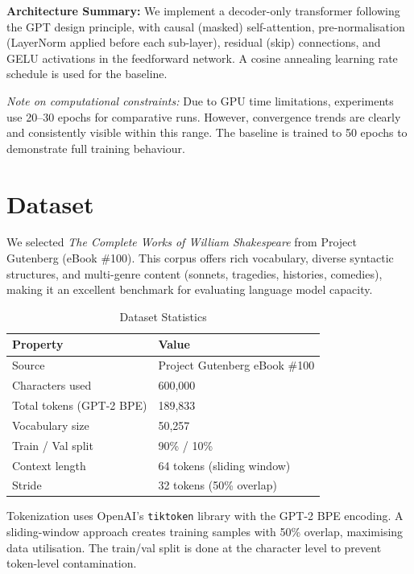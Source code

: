 \documentclass[12pt,a4paper]{article}
\newenvironment{keyinsight}{%
  \begin{tcolorbox}[colback=lightblue!60, colframe=accentblue,
    fonttitle=\bfseries\small\color{navyblue},
    title={Key Insight}, boxrule=0.6pt,
    left=6pt, right=6pt, top=4pt, bottom=4pt]%
}{\end{tcolorbox}}
\begin{document}
\textbf{Architecture Summary:} We implement a decoder-only transformer following the GPT design principle, with causal (masked) self-attention, pre-normalisation (LayerNorm applied before each sub-layer), residual (skip) connections, and GELU activations in the feedforward network. A cosine annealing learning rate schedule is used for the baseline.

\begin{keyinsight}
\textit{Note on computational constraints:} Due to GPU time limitations, experiments use 20–30 epochs for comparative runs. However, convergence trends are clearly and consistently visible within this range. The baseline is trained to 50 epochs to demonstrate full training behaviour.
\end{keyinsight}

\section{Dataset}

We selected \textit{The Complete Works of William Shakespeare} from Project Gutenberg (eBook \#100). This corpus offers rich vocabulary, diverse syntactic structures, and multi-genre content (sonnets, tragedies, histories, comedies), making it an excellent benchmark for evaluating language model capacity.

\begin{table}[H]
\centering
\caption{Dataset Statistics}
\begin{tabular}{ll}
  \toprule
  \textbf{Property} & \textbf{Value} \\
  \midrule
  Source & Project Gutenberg eBook \#100 \\
  Characters used & 600,000 \\
  Total tokens (GPT-2 BPE) & 189,833 \\
  Vocabulary size & 50,257 \\
  Train / Val split & 90\% / 10\% \\
  Context length & 64 tokens (sliding window) \\
  Stride & 32 tokens (50\% overlap) \\
  \bottomrule
\end{tabular}
\end{table}

Tokenization uses OpenAI's \texttt{tiktoken} library with the GPT-2 BPE encoding. A sliding-window approach creates training samples with 50\% overlap, maximising data utilisation. The train/val split is done at the character level to prevent token-level contamination.
\end{document}
